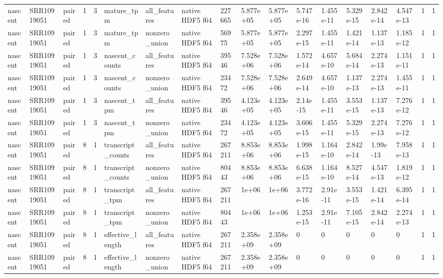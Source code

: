 \begin{tabular}{llllllllllllllllll}
nascent & SRR10919051 & paired & 1 & 3 & mature\_tpm & all\_features & native HDF5 f64 & 227665 & 5.877e+05 & 5.877e+05 & 5.747e-16 & 1.455e-11 & 5.329e-15 & 2.842e-14 & 4.547e-13 & 1 & 1 \\
nascent & SRR10919051 & paired & 1 & 3 & mature\_tpm & nonzero\_union & native HDF5 f64 & 56975 & 5.877e+05 & 5.877e+05 & 2.297e-15 & 1.455e-11 & 1.421e-14 & 1.137e-13 & 1.185e-12 & 1 & 1 \\
nascent & SRR10919051 & paired & 1 & 3 & nascent\_counts & all\_features & native HDF5 f64 & 39546 & 7.528e+06 & 7.528e+06 & 1.572e-14 & 4.657e-10 & 5.684e-14 & 2.274e-13 & 1.151e-11 & 1 & 1 \\
nascent & SRR10919051 & paired & 1 & 3 & nascent\_counts & nonzero\_union & native HDF5 f64 & 23472 & 7.528e+06 & 7.528e+06 & 2.649e-14 & 4.657e-10 & 1.137e-13 & 2.274e-13 & 1.455e-11 & 1 & 1 \\
nascent & SRR10919051 & paired & 1 & 3 & nascent\_tpm & all\_features & native HDF5 f64 & 39546 & 4.123e+05 & 4.123e+05 & 2.14e-15 & 1.455e-11 & 3.553e-15 & 1.137e-13 & 7.276e-12 & 1 & 1 \\
nascent & SRR10919051 & paired & 1 & 3 & nascent\_tpm & nonzero\_union & native HDF5 f64 & 23472 & 4.123e+05 & 4.123e+05 & 3.606e-15 & 1.455e-11 & 5.329e-15 & 2.274e-13 & 7.276e-12 & 1 & 1 \\
nascent & SRR10919051 & paired & 8 & 1 & transcript\_counts & all\_features & native HDF5 f64 & 267211 & 8.853e+06 & 8.853e+06 & 1.998e-15 & 1.164e-10 & 2.842e-14 & 1.99e-13 & 7.958e-13 & 1 & 1 \\
nascent & SRR10919051 & paired & 8 & 1 & transcript\_counts & nonzero\_union & native HDF5 f64 & 80443 & 8.853e+06 & 8.853e+06 & 6.638e-15 & 1.164e-10 & 8.527e-14 & 4.547e-13 & 1.819e-12 & 1 & 1 \\
nascent & SRR10919051 & paired & 8 & 1 & transcript\_tpm & all\_features & native HDF5 f64 & 267211 & 1e+06 & 1e+06 & 3.772e-16 & 2.91e-11 & 3.553e-15 & 1.421e-14 & 6.395e-14 & 1 & 1 \\
nascent & SRR10919051 & paired & 8 & 1 & transcript\_tpm & nonzero\_union & native HDF5 f64 & 80443 & 1e+06 & 1e+06 & 1.253e-15 & 2.91e-11 & 7.105e-15 & 2.842e-14 & 2.274e-13 & 1 & 1 \\
nascent & SRR10919051 & paired & 8 & 1 & effective\_length & all\_features & native HDF5 f64 & 267211 & 2.358e+09 & 2.358e+09 & 0 & 0 & 0 & 0 & 0 & 1 & 1 \\
nascent & SRR10919051 & paired & 8 & 1 & effective\_length & nonzero\_union & native HDF5 f64 & 267211 & 2.358e+09 & 2.358e+09 & 0 & 0 & 0 & 0 & 0 & 1 & 1 \\

\end{tabular}
